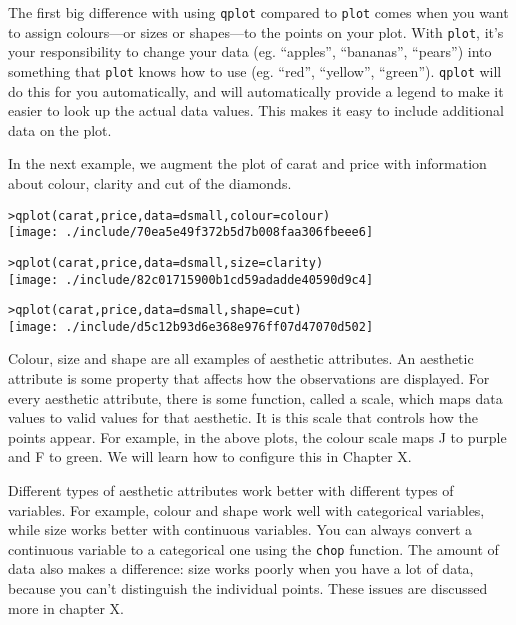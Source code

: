 The first big difference with using {\tt qplot} compared to {\tt plot} comes when you want to assign colours---or sizes or shapes---to the points on your plot.  With {\tt plot}, it's your responsibility to change your data (eg. ``apples'', ``bananas'', ``pears'') into something that {\tt plot} knows how to use (eg. ``red'', ``yellow'', ``green'').  {\tt qplot} will do this for you automatically, and will automatically provide a legend to make it easier to look up the actual data values.  This makes it easy to include additional data on the plot.  

In the next example, we augment the plot of carat and price with information about colour, clarity and cut of the diamonds.

\begin{alltt}
> qplot(carat, price, data = dsmall, colour = colour)
\texttt{[image: ./include/70ea5e49f372b5d7b008faa306fbeee6]}

> qplot(carat, price, data = dsmall, size = clarity)
\texttt{[image: ./include/82c01715900b1cd59adadde40590d9c4]}

> qplot(carat, price, data = dsmall, shape = cut)
\texttt{[image: ./include/d5c12b93d6e368e976ff07d47070d502]}

\end{alltt}

Colour, size and shape are all examples of aesthetic attributes.  An aesthetic attribute is some property that affects how the observations are displayed.  For every aesthetic attribute, there is some function, called a scale, which maps data values to valid values for that aesthetic.  It is this scale that controls how the points appear.  For example, in the above plots, the colour scale maps J to purple and F to green.  We will learn how to configure this in Chapter X.

Different types of aesthetic attributes work better with different types of variables.  For example, colour and shape work well with categorical variables, while size works better with continuous variables.  You can always convert a continuous variable to a categorical one using the {\tt chop} function. The amount of data also makes a difference:  size works poorly when you have a lot of data, because you can't distinguish the individual points.  These issues are discussed more in chapter X.

